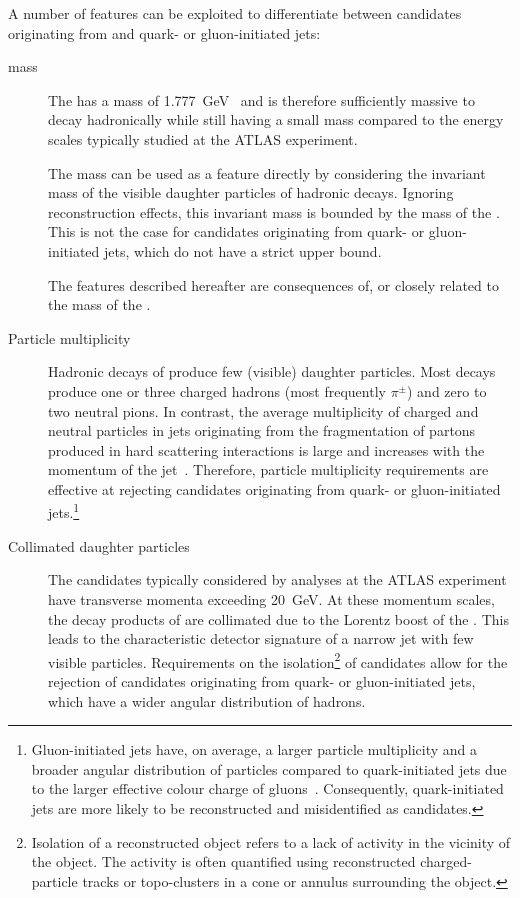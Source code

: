 A number of features can be exploited to differentiate between
\tauhadvis candidates originating from \tauhad and quark- or
gluon-initiated jets:
\begin{description}

\item[\tauleptonC mass] The \taulepton has a mass of
  \SI{1.777}{\GeV}~\cite{pdg2020} and is therefore sufficiently massive to decay
  hadronically while still having a small mass compared to the energy scales
  typically studied at the ATLAS experiment.

  The \tauleptonC mass can be used as a feature directly by considering the
  invariant mass of the visible daughter particles of hadronic \tauleptonC
  decays. Ignoring reconstruction effects, this invariant mass is bounded by the
  mass of the \taulepton. This is not the case for \tauhadvis candidates
  originating from quark- or gluon-initiated jets, which do not have a strict
  upper bound.

  The features described hereafter are consequences of, or closely
  related to the mass of the \taulepton.

\item[Particle multiplicity] Hadronic decays of \tauleptons produce
  few (visible) daughter particles. Most decays produce one or three
  charged hadrons (most frequently $\pi^{\pm}$) and zero to two
  neutral pions.
  In contrast, the average multiplicity of charged and neutral particles in jets
  originating from the fragmentation of partons produced in hard scattering
  interactions is large and increases with the momentum of the
  jet~\cite{Ellis:1996mzs,STDM-2015-12}. Therefore, particle multiplicity
  requirements are effective at rejecting \tauhadvis candidates originating from
  quark- or gluon-initiated jets.\footnote{Gluon-initiated jets have, on
    average, a larger particle multiplicity and a broader angular distribution
    of particles compared to quark-initiated jets due to the larger effective
    colour charge of gluons~\cite{Ellis:1996mzs}. Consequently, quark-initiated
    jets are more likely to be reconstructed and misidentified as \tauhadvis
    candidates.}

\item[Collimated daughter particles] The \tauhadvis candidates typically
  considered by analyses at the ATLAS experiment have transverse momenta
  exceeding \SI{20}{\GeV}. At these momentum scales, the decay products of
  \tauleptons are collimated due to the Lorentz boost of the \taulepton. This
  leads to the characteristic detector signature of a narrow jet with few
  visible particles. Requirements on the isolation\footnote{Isolation of a
    reconstructed object refers to a lack of activity in the vicinity of the
    object. The activity is often quantified using reconstructed
    charged-particle tracks or topo-clusters in a cone or annulus surrounding
    the object.} of \tauhadvis candidates allow for the rejection of candidates
  originating from quark- or gluon-initiated jets, which have a wider angular
  distribution of hadrons.


\end{description}
